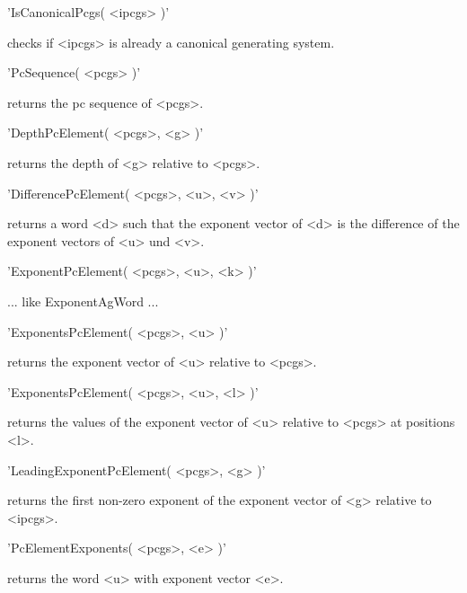 'IsCanonicalPcgs( <ipcgs> )'

checks if <ipcgs> is already a canonical generating system.


'PcSequence( <pcgs> )'

returns the pc sequence of <pcgs>.


'DepthPcElement( <pcgs>, <g> )'

returns the depth of <g> relative to <pcgs>.


'DifferencePcElement( <pcgs>, <u>, <v> )'

returns a word <d> such that the exponent vector of <d> is the difference
of the exponent vectors of <u> und <v>.


'ExponentPcElement( <pcgs>, <u>, <k> )'

... like ExponentAgWord ...


'ExponentsPcElement( <pcgs>, <u> )'

returns the exponent vector of <u> relative to <pcgs>.

'ExponentsPcElement( <pcgs>, <u>, <l> )'

returns the  values of the exponent  vector of <u>  relative to <pcgs> at
positions <l>.


'LeadingExponentPcElement( <pcgs>, <g> )'

returns the first  non-zero  exponent  of  the  exponent vector of    <g>
relative to <ipcgs>.


'PcElementExponents( <pcgs>, <e> )'

returns the word <u> with exponent vector <e>.

